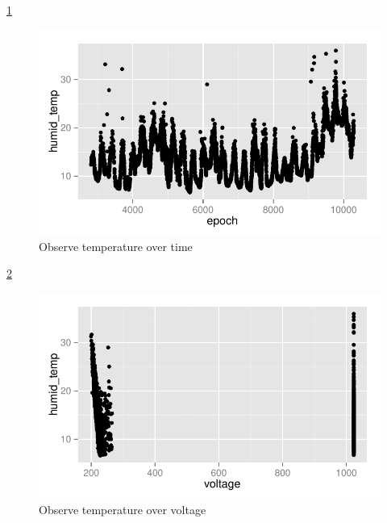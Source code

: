 \documentclass{article}\usepackage[]{graphicx}\usepackage[]{color}
\makeatletter
\def\maxwidth{ %
  \ifdim\Gin@nat@width>\linewidth
    \linewidth
  \else
    \Gin@nat@width
  \fi
}
\newenvironment{knitrout}{}{} %
\makeatother
\begin{document}
\ref{fig:plot_raw_net_epoch_humid_temperature}
\begin{knitrout}
\color{fgcolor}\begin{figure}[h!]


{\centering \includegraphics[width=\maxwidth]{figure/plot_raw_net_epoch_humid_temperature} 

}

\caption[Observe temperature over time]{Observe temperature over time\label{fig:plot_raw_net_epoch_humid_temperature}}
\end{figure}


\end{knitrout}

\ref{fig:plot_raw_net_voltage_temperature}
\begin{knitrout}
\color{fgcolor}\begin{figure}[h!]


{\centering \includegraphics[width=\maxwidth]{figure/plot_raw_net_voltage_temperature} 

}

\caption[Observe temperature over voltage]{Observe temperature over voltage\label{fig:plot_raw_net_voltage_temperature}}
\end{figure}


\end{knitrout}
\end{document}
